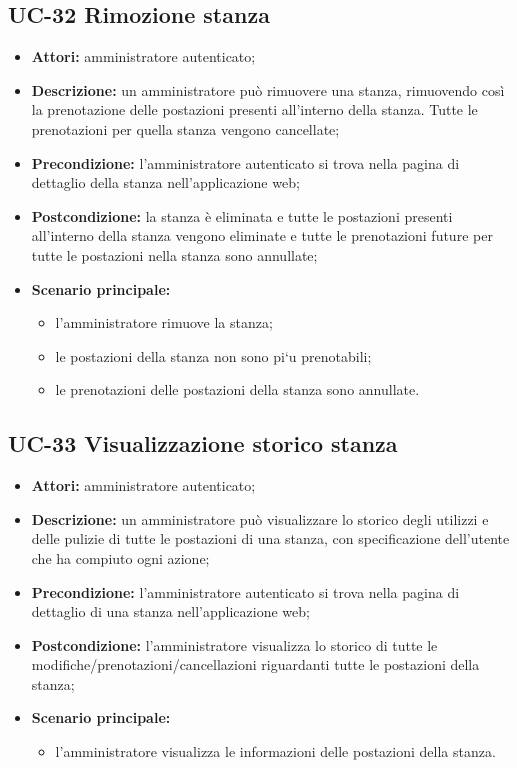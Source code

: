 \subsection{UC-32 Rimozione stanza}
\begin{itemize}
    \item \textbf{Attori:} amministratore autenticato;
    \item \textbf{Descrizione:} un amministratore pu\`{o} rimuovere una stanza, rimuovendo cos\`{i} la prenotazione delle postazioni presenti all'interno della stanza. Tutte le prenotazioni per quella stanza vengono cancellate;
    \item \textbf{Precondizione:} l'amministratore autenticato si trova nella pagina di dettaglio della stanza nell'applicazione web;
    \item \textbf{Postcondizione:} la stanza \`{e} eliminata e tutte le postazioni presenti all'interno della stanza vengono eliminate e tutte le prenotazioni future per tutte le postazioni nella stanza sono annullate;
    \item \textbf{Scenario principale:}
    \begin{itemize}
        \item l'amministratore rimuove la stanza;
        \item le postazioni della stanza non sono pi`{u} prenotabili;
        \item le prenotazioni delle postazioni della stanza sono annullate.
    \end{itemize}
\end{itemize}



\subsection{UC-33 Visualizzazione storico stanza}
\begin{itemize}
    \item \textbf{Attori:} amministratore autenticato;
    \item \textbf{Descrizione:} un amministratore pu\`{o} visualizzare lo storico degli utilizzi e delle pulizie di tutte le postazioni di una stanza, con specificazione dell'utente che ha compiuto ogni azione;
    \item \textbf{Precondizione:} l'amministratore autenticato si trova nella pagina di dettaglio di una stanza nell'applicazione web;
    \item \textbf{Postcondizione:} l'amministratore visualizza lo storico di tutte le modifiche/prenotazioni/cancellazioni riguardanti tutte le postazioni della stanza;
    \item \textbf{Scenario principale:}
    \begin{itemize}
        \item l'amministratore visualizza le informazioni delle postazioni della stanza.
    \end{itemize}
\end{itemize}



